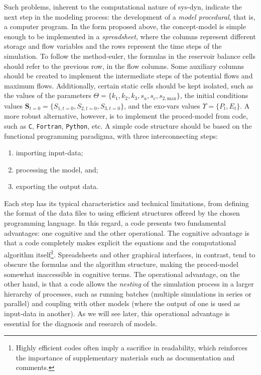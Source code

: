 \documentclass[./main_en.tex]{subfiles}
\begin{document}
\par Such problems, inherent to the computational nature of \gls{sys-dyn}, indicate the next step in the modeling process: the development of a \textit{\gls{model} procedural}, that is, a computer program. In the form proposed above, the \gls{concept-model} is simple enough to be implemented in a \textit{spreadsheet}, where the columns represent different storage and flow variables and the rows represent the time steps of the simulation. To follow the \gls{method-euler}, the formulas in the reservoir balance cells should refer to the previous row, in the flow columns. Some auxiliary columns should be created to implement the intermediate steps of the potential flows and maximum flows. Additionally, certain static cells should be kept isolated, such as the values of the \gls{parameters} $\Theta = \{k_1, k_2, k_3, s_a, s_c, s_{2, \text{max}}\}$, the initial conditions values $\textbf{S}_{t=0} = \{S_{1, t=0}, S_{2, t=0}, S_{3, t=0}\}$, and the \gls{exo-vars} values $\Upsilon = \{P_t, E_t\}$. A more robust alternative, however, is to implement the \gls{proced-model} from code, such as \texttt{C}, \texttt{Fortran}, \texttt{Python}, etc. A simple code structure should be based on the functional programming \gls{paradigma}, with three interconnecting steps: 
\begin{enumerate}
    \item importing \gls{input-data};
    \item processing the \gls{model}, and;
    \item exporting the output data.
\end{enumerate}
Each step has its typical characteristics and technical limitations, from defining the format of the data files to using efficient structures offered by the chosen programming language. In this regard, a code presents two fundamental advantages: one cognitive and the other operational. The cognitive advantage is that a code completely makes explicit the equations and the computational algorithm itself\footnote{Highly efficient codes often imply a sacrifice in readability, which reinforces the importance of supplementary materials such as documentation and comments.}. Spreadsheets and other graphical interfaces, in contrast, tend to obscure the formulas and the algorithm structure, making the \gls{proced-model} somewhat inaccessible in cognitive terms. The operational advantage, on the other hand, is that a code allows the \textit{nesting} of the simulation process in a larger hierarchy of processes, such as running batches (multiple simulations in series or parallel) and coupling with other models (where the output of one is used as \gls{input-data} in another). As we will see later, this operational advantage is essential for the diagnosis and research of models.
\end{document}
